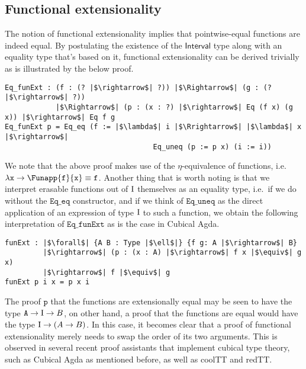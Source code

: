 \documentclass[12pt,twoside,maitrise]{dms}
\theoremstyle{definition}
\numberwithin{equation}{section}
\numberwithin{table}{chapter}
\numberwithin{figure}{chapter}
\newcommand\id[1] {\texttt{#1}}
\newcommand\type[1] {\textsf{#1}} %
\begin{document}
\subsection*{Functional extensionality}\label{subsec:funext}
The notion of functional extensionality implies that pointwise-equal functions
are indeed equal. By postulating the existence of the $\type{Interval}$ type
along with an equality type that's based on it, functional extensionality can be
derived trivially as is illustrated by the below proof.

\begin{verbatim}
Eq_funExt : (f : (? |$\rightarrow$| ?)) |$\Rightarrow$| (g : (? |$\rightarrow$| ?))
            |$\Rightarrow$| (p : (x : ?) |$\rightarrow$| Eq (f x) (g x)) |$\rightarrow$| Eq f g
Eq_funExt p = Eq_eq (f := |$\lambda$| i |$\Rrightarrow$| |$\lambda$| x |$\rightarrow$|
                                   Eq_uneq (p := p x) (i := i))
\end{verbatim}

We note that the above proof makes use of the $\eta$-equivalence of functions,
i.e. $\lambda \id{x} \rightarrow \Funapp{\id{f}}{\id{x}} \equiv \id{f}$. Another
thing that is worth noting is that we interpret erasable functions out of $\mathrm{I}$
themselves as an equality type, i.e.\ if we do without the $\id{Eq\_eq}$
constructor, and if we think of $\id{Eq\_uneq}$ as the direct application of an
expression of type $\mathrm{I}$ to such a function, we obtain the following
interpretation of $\id{Eq\_funExt}$ as is the case in Cubical Agda.

\begin{verbatim}
funExt : |$\forall$| {A B : Type |$\ell$|} {f g: A |$\rightarrow$| B}
         |$\rightarrow$| (p : (x : A) |$\rightarrow$| f x |$\equiv$| g x)
         |$\rightarrow$| f |$\equiv$| g
funExt p i x = p x i
\end{verbatim}

The proof $\id{p}$ that the functions are extensionally equal may be seen to
have the type $\id{A} \rightarrow \bI \rightarrow B$, on other hand, a proof
that the functions are equal would have the type $\mathrm{I} \rightarrow (A \rightarrow
B)$. In this case, it becomes clear that a proof of functional extensionality
merely needs to swap the order of its two arguments. This is observed in several
recent proof assistants that implement cubical type theory, such as Cubical Agda
as mentioned before, as well as coolTT and redTT.\@
\end{document}
